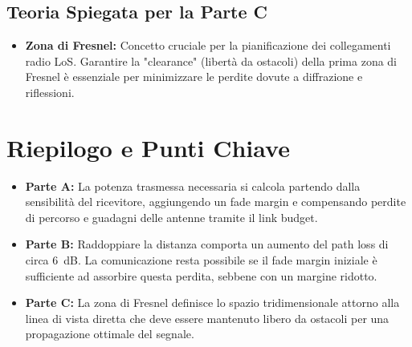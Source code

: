 \subsection*{Teoria Spiegata per la Parte C}
\begin{itemize}
    \item \textbf{Zona di Fresnel:} Concetto cruciale per la pianificazione dei collegamenti radio LoS. Garantire la "clearance" (libertà da ostacoli) della prima zona di Fresnel è essenziale per minimizzare le perdite dovute a diffrazione e riflessioni.
\end{itemize}

\section*{Riepilogo e Punti Chiave}
\begin{itemize}
    \item \textbf{Parte A:} La potenza trasmessa necessaria si calcola partendo dalla sensibilità del ricevitore, aggiungendo un fade margin e compensando perdite di percorso e guadagni delle antenne tramite il link budget.
    \item \textbf{Parte B:} Raddoppiare la distanza comporta un aumento del path loss di circa \SI{6}{dB}. La comunicazione resta possibile se il fade margin iniziale è sufficiente ad assorbire questa perdita, sebbene con un margine ridotto.
    \item \textbf{Parte C:} La zona di Fresnel definisce lo spazio tridimensionale attorno alla linea di vista diretta che deve essere mantenuto libero da ostacoli per una propagazione ottimale del segnale.
\end{itemize}


